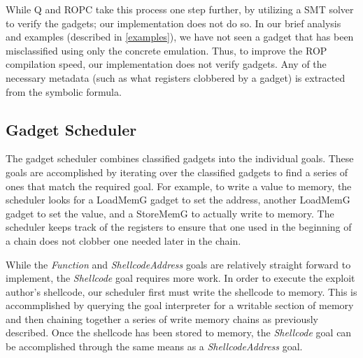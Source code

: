 \documentclass[journal]{IEEEtran}
\begin{document}
While Q \cite{schwartz2011q} and ROPC \cite{ropc} take this process one step further, by utilizing a SMT solver to verify the gadgets; our implementation does not do so.
In our brief analysis and examples (described in \ref{examples}), we have not seen a gadget that has been misclassified using only the concrete emulation.
Thus, to improve the ROP compilation speed, our implementation does not verify gadgets.
Any of the necessary metadata (such as what registers clobbered by a gadget) is extracted from the symbolic formula.

\subsection{Gadget Scheduler}\label{scheduler}
The gadget scheduler combines classified gadgets into the individual goals.
These goals are accomplished by iterating over the classified gadgets to find a series of ones that match the required goal. 
For example, to write a value to memory, the scheduler looks for a LoadMemG gadget to set the address, another LoadMemG gadget to set the value, and a StoreMemG to actually write to memory.
The scheduler keeps track of the registers to ensure that one used in the beginning of a chain does not clobber one needed later in the chain.

While the \emph{Function} and \emph{ShellcodeAddress} goals are relatively straight forward to implement, the \emph{Shellcode} goal requires more work. 
In order to execute the exploit author's shellcode, our scheduler first must write the shellcode to memory.
This is accommplished by querying the goal interpreter for a writable section of memory and then chaining together a series of write memory chains as previously described.
Once the shellcode has been stored to memory, the \emph{Shellcode} goal can be accomplished through the same means as a \emph{ShellcodeAddress} goal.
\end{document}
